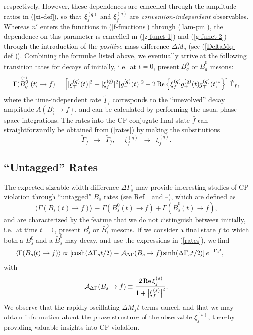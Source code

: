 \documentclass[12pt]{article}
\begin{document}
respectively. However, these dependences are cancelled through the 
amplitude ratios in (\ref{xi-def}), so that $\xi_f^{(q)}$ and 
$\xi_{\bar f}^{(q)}$ are {\it convention-independent} observables. 
Whereas $n'$ enters the functions in (\ref{f-functions}) through 
(\ref{lam-pm}), the dependence on this parameter is cancelled in 
(\ref{g-funct-1}) and (\ref{g-funct-2}) through the introduction of 
the {\it positive} mass difference $\Delta M_q$ (see (\ref{DeltaMq-def})). 
Combining the formulae listed above, we eventually arrive at the 
following transition rates for decays of initially, i.e.\ at $t=0$, 
present $B^0_q$ or $\bar B^0_q$ mesons:
\begin{equation}\label{rates}
\Gamma(\stackrel{{\mbox{\tiny (--)}}}{B^0_q}(t)\to f)
=\left[|g_\mp^{(q)}(t)|^2+|\xi_f^{(q)}|^2|g_\pm^{(q)}(t)|^2-
2\mbox{\,Re}\left\{\xi_f^{(q)}
g_\pm^{(q)}(t)g_\mp^{(q)}(t)^\ast\right\}
\right]\tilde\Gamma_f,
\end{equation}
where the time-independent rate $\tilde\Gamma_f$ corresponds to the 
``unevolved'' decay amplitude $A(B^0_q\to f)$, and can be calculated by 
performing the usual phase-space integrations. The rates into the 
CP-conjugate final state $\bar f$ can straightforwardly be obtained from 
(\ref{rates}) by making the substitutions
\begin{equation}
\tilde\Gamma_f  \,\,\,\to\,\,\, 
\tilde\Gamma_{\bar f},
\quad\,\,\xi_f^{(q)} \,\,\,\to\,\,\, 
\xi_{\bar f}^{(q)}.
\end{equation}

%
%
%
\subsection{``Untagged'' Rates}
%
%
%
The expected sizeable width difference $\Delta\Gamma_s$ may provide interesting studies of CP 
violation through ``untagged'' $B_s$ rates 
(see Ref.~\cite{DDF} and \cite{dun}--\cite{DFN}), which are defined as 
\begin{equation}
\langle\Gamma(B_s(t)\to f)\rangle
\equiv\Gamma(B^0_s(t)\to f)+\Gamma(\bar B^0_s(t)\to f),
\end{equation}
and are characterized by the feature that we do not distinguish between
initially, i.e.\ at time $t=0$, present $B^0_s$ or $\bar B^0_s$ mesons. 
If we consider a final state $f$ to which both a $B^0_s$ and a $\bar B^0_s$ 
may decay, and use the expressions in (\ref{rates}), we find
\begin{equation}\label{untagged-rate}
\hspace*{-0.7truecm}\langle\Gamma(B_s(t)\to f)\rangle
\propto \left[\cosh(\Delta\Gamma_st/2)-{\cal A}_{\Delta\Gamma}(B_s\to f)
\sinh(\Delta\Gamma_st/2)\right]e^{-\Gamma_s t},
\end{equation}
with
\begin{equation}\label{ADGam}
{\cal A}_{\rm \Delta\Gamma}(B_s\to f)\equiv
\frac{2\,\mbox{Re}\,\xi^{(s)}_f}{1+\bigl|\xi^{(s)}_f
\bigr|^2}.
\end{equation}
We observe that the rapidly oscillating 
$\Delta M_st$ terms cancel, and that we may obtain information about the 
phase structure of the observable $\xi_f^{(s)}$, thereby providing valuable
insights into CP violation. 
\end{document}
